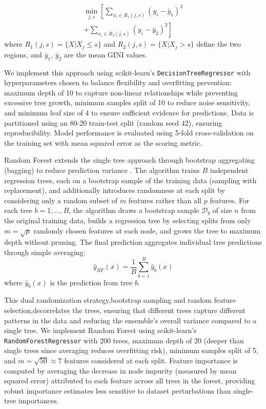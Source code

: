 \documentclass[10pt,twocolumn]{article}
\begin{document}
\begin{multline}
\min_{j,s} \left[\sum_{x_i \in R_1(j,s)} (y_i - \bar{y}_1)^2 \right. \\
\left. + \sum_{x_i \in R_2(j,s)} (y_i - \bar{y}_2)^2\right]
\end{multline}
where $R_1(j,s) = \{X | X_j \leq s\}$ and $R_2(j,s) = \{X | X_j > s\}$ define the two regions, and $\bar{y}_1$, $\bar{y}_2$ are the mean GINI values.
\par We implement this approach using scikit-learn's \texttt{DecisionTreeRegressor} with hyperparameters chosen to balance flexibility and overfitting prevention: maximum depth of 10 to capture non-linear relationships while preventing excessive tree growth, minimum samples split of 10 to reduce noise sensitivity, and minimum leaf size of 4 to ensure sufficient evidence for predictions. Data is partitioned using an 80-20 train-test split (random seed 42), ensuring reproducibility. Model performance is evaluated using 5-fold cross-validation on the training set with mean squared error as the scoring metric.

\par Random Forest extends the single tree approach through bootstrap aggregating (bagging) to reduce prediction variance \cite{breiman2001random}. The algorithm trains $B$ independent regression trees, each on a bootstrap sample of the training data (sampling with replacement), and additionally introduces randomness at each split by considering only a random subset of $m$ features rather than all $p$ features. For each tree $b = 1, \ldots, B$, the algorithm draws a bootstrap sample $\mathcal{D}_b$ of size $n$ from the original training data, builds a regression tree by selecting splits from only $m = \sqrt{p}$ randomly chosen features at each node, and grows the tree to maximum depth without pruning. The final prediction aggregates individual tree predictions through simple averaging:
\begin{equation}
\hat{y}_{RF}(x) = \frac{1}{B} \sum_{b=1}^{B} \hat{y}_b(x)
\end{equation}
where $\hat{y}_b(x)$ is the prediction from tree $b$.
\par This dual randomization strategy,bootstrap sampling and random feature selection,decorrelates the trees, ensuring that different trees capture different patterns in the data and reducing the ensemble's overall variance compared to a single tree. We implement Random Forest using scikit-learn's \texttt{RandomForestRegressor} with 200 trees, maximum depth of 20 (deeper than single trees since averaging reduces overfitting risk), minimum samples split of 5, and $m = \sqrt{50} \approx 7$ features considered at each split. Feature importance is computed by averaging the decrease in node impurity (measured by mean squared error) attributed to each feature across all trees in the forest, providing robust importance estimates less sensitive to dataset perturbations than single-tree importances.
\end{document}
